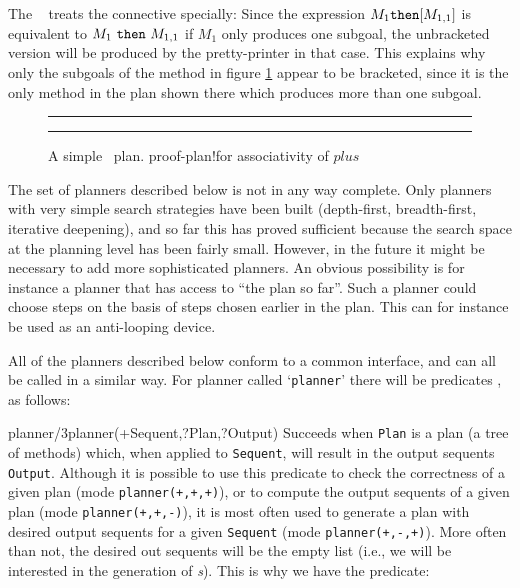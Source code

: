 \sloppypar
The \clam\  treats the  connective
specially: Since the expression $M_1 {\tt then} [M_{1,1}]$ is
equivalent to $M_1 {\tt \ then\ } M_{1,1}$ if $M_1$ only produces one
subgoal, the unbracketed version will be produced by the
pretty-printer in that case. This explains why only the subgoals of
the  method in figure \ref{assp-plan} appear to be
bracketed, since it is the only method in the plan shown there which
produces more than one subgoal.

\begin{figure}[tb]
\hrule\vspace{1ex}{\small\begin{verbatim}
induction(lemma(pnat_primitive)-[(x:pnat)-s(v0)]) then 
  [base_case([...]),
   step_case([...])
  ]
\end{verbatim}
}
\caption{A simple \protect\clam\ plan.\example
        {proof-plan!for associativity of $plus$}}
\label{assp-plan}
\vspace{1ex}
\hrule
\end{figure}

The set of planners described below is not in any way complete. Only
planners with very simple search strategies have been built
(depth-first, breadth-first, iterative deepening), and so far this has
proved sufficient because the search space at the planning level has
been fairly small. However, in the future it might be necessary to add
more sophisticated planners. An obvious possibility is for instance
a planner that has access to ``the plan so far''. Such a planner could
choose steps on the basis of steps chosen earlier in the plan. This
can for instance be used as an anti-looping device.

All of the planners described below conform to a common interface, and
can all be called in a similar way. For planner called `{\tt planner}'
there will be predicates , as follows:

\begin{predicate}{planner/3}{planner(+Sequent,?Plan,?Output)}%
Succeeds when {\tt Plan} is a plan (a tree of methods) which, when
applied to {\tt Sequent}, will result in the output sequents
{\tt Output}. Although it is possible to use this predicate to
check the correctness of a given plan (mode {\tt planner(+,+,+)}),
or to compute the output sequents of a given plan (mode
{\tt planner(+,+,-)}), it is most often used to generate a plan
with desired output sequents for a given {\tt Sequent} (mode
{\tt planner(+,-,+)}). More often than not, the desired out
sequents will be the empty list (i.e., we will be interested in the
generation of {\em {}s}). This is why we have the
predicate:
\end{predicate}

